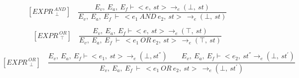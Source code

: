    	\[
   	[EXPR^{\ AND}_{\ \ \bot}] \quad
   	\dfrac{E_v, \ E_a, \ E_f \vdash <e, \ st> \rightarrow_e (\bot, \ st) }{E_v, \ E_a, \ E_f \ \vdash \ <e_1 \ AND \ e_2, \ st> \ \rightarrow_e (\bot, \ st)}
   	\]
   	
   	
   	\[
   	[EXPR^{\ OR}_{\ \ \top}] \quad
   	\dfrac{E_v, \ E_a, \ E_f \vdash <e, \ st> \rightarrow_e (\top, \ st) }{E_v, \ E_a, \ E_f \ \vdash \ <e_1 \ OR \ e_2, \ st> \ \rightarrow_e (\top, \ st)}
   	\]
   	
   	\[
   	[EXPR^{\ OR}_{\ \ \bot}] \quad
   	\dfrac{E_v, \ E_a, \ E_f \vdash <e_1, \ st> \rightarrow_e (\bot, st^{''}) \qquad E_v, \ E_a, \ E_f \vdash <e_2, \ st^{''} \rightarrow_e (\bot, \ st^{'})}{E_v, \ E_a, \ E_f \ \vdash \ <e_1 \ OR \ e_2, \ st> \ \rightarrow_e (\bot, \ st^{'})}
   	\]  	
   	
   	

